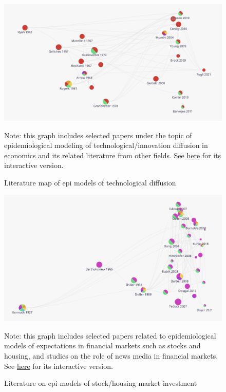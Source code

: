 \begin{figure}[!ht] \centering  %
	\caption{Literature map of epi models of technological diffusion}
	\label{fig:graph_diffusion}
	\centerline{\includegraphics[width=\textwidth]{./figures/graph_diffusion.png}}
		\begin{flushleft}
{\footnotesize Note: this graph includes selected papers under the topic of epidemiological modeling of technological/innovation diffusion in economics and its related literature from other fields. See \href{https://app.litmaps.co/shared/1D9003CB-75FE-4633-B60A-79B70E03B691}{here} for its interactive version.}
				\end{flushleft}
\end{figure}


\newpage


\begin{figure}[!ht] \centering  %
	\caption{Literature on epi models of stock/housing market investment}
	\label{fig:graph_investment}
	\centerline{\includegraphics[width=\textwidth]{./figures/graph_investment.png}}
			\begin{flushleft}
	{\footnotesize Note: this graph includes selected papers related to epidemiological models of expectations in financial markets such as stocks and housing, and studies on the role of news media in financial markets. See \href{https://app.litmaps.co/shared/E25276CA-8725-437B-8241-11961EFB3FB4}{here} for its interactive version.}
					\end{flushleft}
\end{figure}

